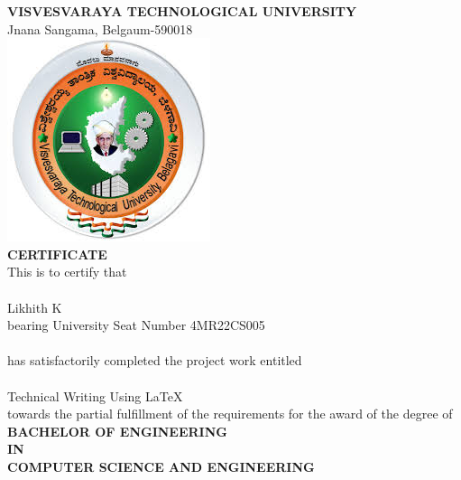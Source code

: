 \documentclass[12pt, a4paper]{report}
\begin{document}
	
	\begin{titlepage}
		\begin{center}
			\textbf{{\large VISVESVARAYA TECHNOLOGICAL UNIVERSITY}}\\
			{\normalsize Jnana Sangama, Belgaum-590018}\\
			\vspace{0.5in}
			\includegraphics[scale=0.5]{images/vtu.jpeg}\\
			\vspace{0.5in}
			\textbf{CERTIFICATE}\\
			\vspace{0.3in}
			This is to certify that \\
			\vspace{0.2in}
			\underline{\hspace{10cm}}\\
			\vspace{0.2in}
			Likhith K\\
			\vspace{0.2in}
			bearing University Seat Number 4MR22CS005\\
			\underline{\hspace{10cm}}\\
			\vspace{0.2in}
			has satisfactorily completed the project work entitled \\
			\vspace{0.2in}
			\underline{\hspace{10cm}}\\
			\vspace{0.2in}
			Technical Writing Using LaTeX\\
			\vspace{0.2in}
			towards the partial fulfillment of the requirements for the award of the degree of\\
			\vspace{0.2in}
			\textbf{BACHELOR OF ENGINEERING\\IN\\COMPUTER SCIENCE AND ENGINEERING}\\

\end{center}
\end{titlepage}
\end{document}
